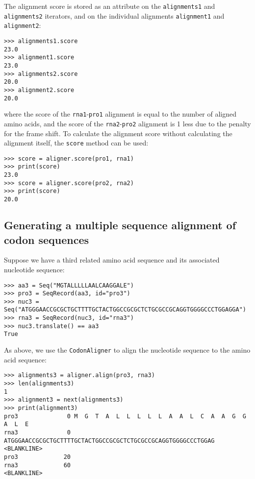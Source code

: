 The alignment score is stored as an attribute on the \verb+alignments1+ and \verb+alignments2+ iterators, and on the individual alignments \verb+alignment1+ and \verb+alignment2+:
\begin{verbatim}
>>> alignments1.score
23.0
>>> alignment1.score
23.0
>>> alignments2.score
20.0
>>> alignment2.score
20.0
\end{verbatim}
where the score of the \verb+rna1+-\verb+pro1+ alignment is equal to the number of aligned amino acids, and the score of the \verb+rna2+-\verb+pro2+ alignment is 1 less due to the penalty for the frame shift. To calculate the alignment score without calculating the alignment itself, the \verb+score+ method can be used:
\begin{verbatim}
>>> score = aligner.score(pro1, rna1)
>>> print(score)
23.0
>>> score = aligner.score(pro2, rna2)
>>> print(score)
20.0
\end{verbatim}

\subsection{Generating a multiple sequence alignment of codon sequences}
\label{sec:msa_codons}

Suppose we have a third related amino acid sequence and its associated nucleotide sequence:
\begin{verbatim}
>>> aa3 = Seq("MGTALLLLLAALCAAGGALE")
>>> pro3 = SeqRecord(aa3, id="pro3")
>>> nuc3 = Seq("ATGGGAACCGCGCTGCTTTTGCTACTGGCCGCGCTCTGCGCCGCAGGTGGGGCCCTGGAGGA")
>>> rna3 = SeqRecord(nuc3, id="rna3")
>>> nuc3.translate() == aa3
True
\end{verbatim}
As above, we use the \verb+CodonAligner+ to align the nucleotide sequence to the amino acid sequence:
\begin{verbatim}
>>> alignments3 = aligner.align(pro3, rna3)
>>> len(alignments3)
1
>>> alignment3 = next(alignments3)
>>> print(alignment3)
pro3              0 M  G  T  A  L  L  L  L  L  A  A  L  C  A  A  G  G  A  L  E  
rna3              0 ATGGGAACCGCGCTGCTTTTGCTACTGGCCGCGCTCTGCGCCGCAGGTGGGGCCCTGGAG
<BLANKLINE>
pro3             20 
rna3             60 
<BLANKLINE>
\end{verbatim}

